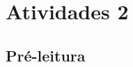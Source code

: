 \documentclass[12pt]{extarticle}
\begin{document}
\section{Atividades 2}

\subsection{Pré-leitura}

%
%
%
%
%
%
\end{document}
